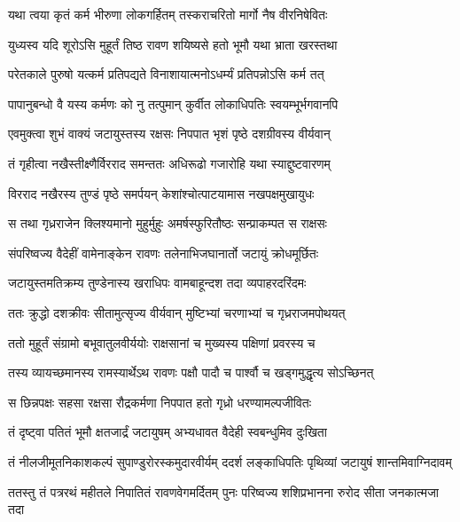 \twolineshloka
{यथा त्वया कृतं कर्म भीरुणा लोकगर्हितम्}
{तस्कराचरितो मार्गो नैष वीरनिषेवितः} %

\twolineshloka
{युध्यस्व यदि शूरोऽसि मुहूर्तं तिष्ठ रावण}
{शयिष्यसे हतो भूमौ यथा भ्राता खरस्तथा} %

\twolineshloka
{परेतकाले पुरुषो यत्कर्म प्रतिपद्यते}
{विनाशायात्मनोऽधर्म्यं प्रतिपन्नोऽसि कर्म तत्} %

\twolineshloka
{पापानुबन्धो वै यस्य कर्मणः को नु तत्पुमान्}
{कुर्वीत लोकाधिपतिः स्वयम्भूर्भगवानपि} %

\twolineshloka
{एवमुक्त्वा शुभं वाक्यं जटायुस्तस्य रक्षसः}
{निपपात भृशं पृष्ठे दशग्रीवस्य वीर्यवान्} %

\twolineshloka
{तं गृहीत्वा नखैस्तीक्ष्णैर्विरराद समन्ततः}
{अधिरूढो गजारोहि यथा स्याद्दुष्टवारणम्} %

\twolineshloka
{विरराद नखैरस्य तुण्डं पृष्ठे समर्पयन्}
{केशांश्चोत्पाटयामास नखपक्षमुखायुधः} %

\twolineshloka
{स तथा गृध्रराजेन क्लिश्यमानो मुहुर्मुहुः}
{अमर्षस्फुरितौष्ठः सन्प्राकम्पत स राक्षसः} %

\twolineshloka
{संपरिष्वज्य वैदेहीं वामेनाङ्केन रावणः}
{तलेनाभिजघानार्तो जटायुं क्रोधमूर्छितः} %

\twolineshloka
{जटायुस्तमतिक्रम्य तुण्डेनास्य खराधिपः}
{वामबाहून्दश तदा व्यपाहरदरिंदमः} %

\twolineshloka
{ततः क्रुद्धो दशक्रीवः सीतामुत्सृज्य वीर्यवान्}
{मुष्टिभ्यां चरणाभ्यां च गृध्रराजमपोथयत्} %

\twolineshloka
{ततो मुहूर्तं संग्रामो बभूवातुलवीर्ययोः}
{राक्षसानां च मुख्यस्य पक्षिणां प्रवरस्य च} %

\twolineshloka
{तस्य व्यायच्छमानस्य रामस्यार्थेऽथ रावणः}
{पक्षौ पादौ च पार्श्वौ च खड्गमुद्धृत्य सोऽच्छिनत्} %

\twolineshloka
{स छिन्नपक्षः सहसा रक्षसा रौद्रकर्मणा}
{निपपात हतो गृध्रो धरण्यामल्पजीवितः} %

\twolineshloka
{तं दृष्ट्वा पतितं भूमौ क्षतजार्द्रं जटायुषम्}
{अभ्यधावत वैदेही स्वबन्धुमिव दुःखिता} %

\fourlineindentedshloka
{तं नीलजीमूतनिकाशकल्पं}
{ सुपाण्डुरोरस्कमुदारवीर्यम्}
{ददर्श लङ्काधिपतिः पृथिव्यां}
{ जटायुषं शान्तमिवाग्निदावम्} %

\fourlineindentedshloka
{ततस्तु तं पत्ररथं महीतले}
{ निपातितं रावणवेगमर्दितम्}
{पुनः परिष्वज्य शशिप्रभानना}
{ रुरोद सीता जनकात्मजा तदा} %


